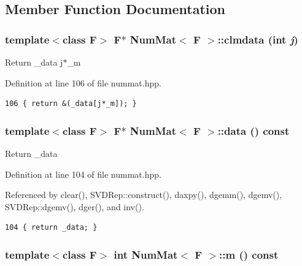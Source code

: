 \subsection{Member Function Documentation}
\subsubsection{\setlength{\rightskip}{0pt plus 5cm}template$<$class F$>$ F$\ast$ {\bf Num\-Mat}$<$ F $>$::clmdata (int {\em j})\hspace{0.3cm}{\tt  [inline]}}\label{classNumMat_29a94d113c6ed3f2191bb35c48a46e16_29a94d113c6ed3f2191bb35c48a46e16}


Return \_\-data j$\ast$\_\-m 

Definition at line 106 of file nummat.hpp.

\footnotesize\begin{verbatim}106 { return &(_data[j*_m]); }
\end{verbatim}\normalsize 


\subsubsection{\setlength{\rightskip}{0pt plus 5cm}template$<$class F$>$ F$\ast$ {\bf Num\-Mat}$<$ F $>$::data () const\hspace{0.3cm}{\tt  [inline]}}\label{classNumMat_ad3b2b9598c8547b4f7afe7a79ed520c_ad3b2b9598c8547b4f7afe7a79ed520c}


Return \_\-data 

Definition at line 104 of file nummat.hpp.

Referenced by clear(), SVDRep::construct(), daxpy(), dgemm(), dgemv(), SVDRep::dgemv(), dger(), and inv().

\footnotesize\begin{verbatim}104 { return _data; }
\end{verbatim}\normalsize 


\subsubsection{\setlength{\rightskip}{0pt plus 5cm}template$<$class F$>$ int {\bf Num\-Mat}$<$ F $>$::m () const\hspace{0.3cm}{\tt  [inline]}}\label{classNumMat_6a2fa69c25bf8ed36e019d0fb3f5e966_6a2fa69c25bf8ed36e019d0fb3f5e966}


